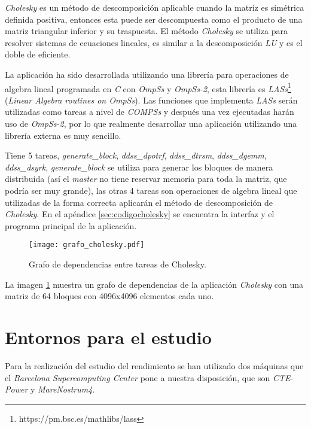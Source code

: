 \textit{Cholesky} es un método de descomposición aplicable cuando la matriz es simétrica definida positiva, entonces esta puede ser descompuesta como el producto de una matriz triangular inferior y su traspuesta. El método \textit{Cholesky} se utiliza para resolver sistemas de ecuaciones lineales, es similar a la descomposición \textit{LU} y es el doble de eficiente.
\par\bigskip
La aplicación ha sido desarrollada utilizando una librería para operaciones de algebra lineal programada en \textit{C} con \textit{OmpSs} y \textit{OmpSs-2}, esta librería es \textit{LASs}\footnote{https://pm.bsc.es/mathlibs/lass} (\textit{Linear Algebra routines on OmpSs}). Las funciones que implementa \textit{LASs} serán utilizadas como tareas a nivel de \textit{COMPSs} y después una vez ejecutadas harán uso de \textit{OmpSs-2}, por lo que realmente desarrollar una aplicación utilizando una librería externa es muy sencillo.
\par\bigskip
Tiene 5 tareas, \textit{generate\_block}, \textit{ddss\_dpotrf}, \textit{ddss\_dtrsm}, \textit{ddss\_dgemm}, \textit{ddss\_dsyrk}, \textit{generate\_block} se utiliza para generar los bloques de manera distribuida (así el \textit{master} no tiene reservar memoria para toda la matriz, que podría ser muy grande), las otras 4 tareas son operaciones de algebra lineal que utilizadas de la forma correcta aplicarán el método de descomposición de \textit{Cholesky}.
En el apéndice \ref{sec:codigocholesky} se encuentra la interfaz y el programa principal de la aplicación. 

\begin{figure}[h]
	\centering 
	\caption{Grafo de dependencias entre tareas de Cholesky.}
	\texttt{[image: grafo\_cholesky.pdf]}
	\label{fig:grafocholesky}
\end{figure}

La imagen \ref{fig:grafocholesky} muestra un grafo de dependencias de la aplicación \textit{Cholesky} con una matriz de 64 bloques con 4096x4096 elementos cada uno. 

\section{Entornos para el estudio}

Para la realización del estudio del rendimiento se han utilizado dos máquinas que el \textit{Barcelona Supercomputing Center} pone a nuestra disposición, que son \textit{CTE-Power} y \textit{MareNostrum4}.

